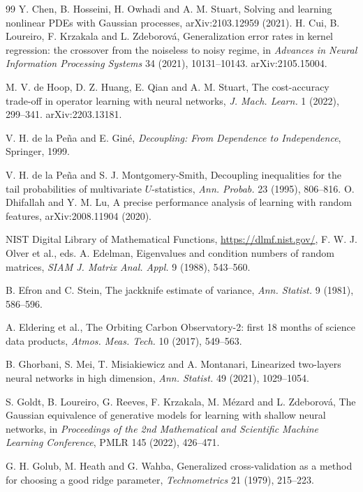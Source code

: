 \documentclass[11pt]{article}
\theoremstyle{definition}
\begin{document}
\begin{thebibliography}{99}
 Y. Chen, B. Hosseini, H. Owhadi and A. M. Stuart, Solving and learning nonlinear PDEs with Gaussian processes, arXiv:2103.12959 (2021).
 H. Cui, B. Loureiro, F. Krzakala and L. Zdeborov\'a, Generalization error rates in
kernel regression: the crossover from the noiseless to noisy regime, in \emph{Advances in Neural
Information Processing Systems} 34 (2021), 10131--10143. arXiv:2105.15004.

 M. V. de Hoop, D. Z. Huang, E. Qian and A. M. Stuart, The cost-accuracy trade-off
in operator learning with neural networks, \emph{J. Mach. Learn.} 1 (2022), 299--341.
arXiv:2203.13181.


 V. H. de la Pe\~na and E. Gin\'e, \emph{Decoupling: From Dependence to Independence}, Springer, 1999.

 V. H. de la Pe\~na and S. J. Montgomery-Smith, Decoupling inequalities for the tail probabilities of multivariate $U$-statistics, \emph{Ann. Probab.} 23 (1995), 806--816.
 O. Dhifallah and Y. M. Lu, A precise performance analysis of learning with
random features, arXiv:2008.11904 (2020).


 NIST Digital Library of Mathematical Functions, \url{https://dlmf.nist.gov/}, F. W. J. Olver et al., eds.
 A. Edelman, Eigenvalues and condition numbers of random matrices, \emph{SIAM J.
Matrix Anal. Appl.} 9 (1988), 543--560.

 B. Efron and C. Stein, The jackknife estimate of variance, \emph{Ann.
Statist.} 9 (1981), 586--596.

 A. Eldering et al., The Orbiting Carbon Observatory-2: first 18 months of
science data products, \emph{Atmos. Meas. Tech.} 10 (2017), 549--563.

 B. Ghorbani, S. Mei, T. Misiakiewicz and A. Montanari, Linearized two-layers
neural networks in high dimension, \emph{Ann. Statist.} 49 (2021), 1029--1054.

 S. Goldt, B. Loureiro, G. Reeves, F. Krzakala, M. M\'ezard and L. Zdeborov\'a, The
Gaussian equivalence of generative models for learning with shallow neural networks, in
\emph{Proceedings of the 2nd Mathematical and Scientific Machine Learning Conference}, PMLR 145
(2022), 426--471.

 G. H. Golub, M. Heath and G. Wahba, Generalized cross-validation as a method for
choosing a good ridge parameter, \emph{Technometrics} 21 (1979), 215--223.


\end{thebibliography}
\end{document}
